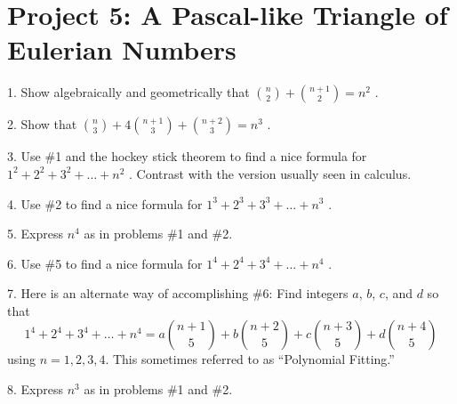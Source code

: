 \documentclass[10pt,]{book}
\theoremstyle{plain}
\theoremstyle{definition}
\theoremstyle{definition}
\theoremstyle{definition}
\numberwithin{equation}{chapter}
\begin{document}
\section[{Project 5: A Pascal-like Triangle of Eulerian Numbers}]{Project 5: A Pascal-like Triangle of Eulerian Numbers}\label{exercises-5}
\begin{exerciselist}
\item[1.]\hypertarget{exercise-35}{}\hypertarget{p-1710}{}%
Show algebraically and geometrically that \(\binom{n}{2}
+
\binom{n + 1}{2}
= n^{2}\) .%
\par\smallskip
\item[2.]\hypertarget{exercise-36}{}\hypertarget{p-1711}{}%
Show that \(\binom{n}{3}
+ 4
\binom{n + 1}{3}
+
\binom{n + 2}{3}
= n^{3}\) .%
\par\smallskip
\item[3.]\hypertarget{exercise-37}{}\hypertarget{p-1712}{}%
Use \#1 and the hockey stick theorem to find a nice formula for \(1^{2} + 2^{2} + 3^{2} + \ldots + n^{2}\) . Contrast with the version usually seen in calculus.%
\par\smallskip
\item[4.]\hypertarget{exercise-38}{}\hypertarget{p-1713}{}%
Use \#2 to find a nice formula for \(1^{3} + 2^{3} + 3^{3} + \ldots + n^{3}\) .%
\par\smallskip
\item[5.]\hypertarget{exercise-39}{}\hypertarget{p-1714}{}%
Express \(n^{4}\) as in problems \#1 and \#2.%
\par\smallskip
\item[6.]\hypertarget{exercise-40}{}\hypertarget{p-1715}{}%
Use \#5 to find a nice formula for \(1^{4} + 2^{4} + 3^{4} + \ldots + n^{4}\) .%
\par\smallskip
\item[7.]\hypertarget{exercise-41}{}\hypertarget{p-1716}{}%
Here is an alternate way of accomplishing \#6:  Find integers \(a\), \(b\), \(c\), and \(d\) so that%
\begin{equation*}
1^{4} + 2^{4} + 3^{4} + \ldots + n^{4} = a\binom{n + 1}{5}  + b\binom{n + 2}{5}  + c\binom{n + 3}{5}  + d\binom{n + 4}{5}
\end{equation*}
using \(n=1, 2, 3, 4\). This sometimes referred to as ``Polynomial Fitting.''%
\par\smallskip
\item[8.]\hypertarget{exercise-42}{}\hypertarget{p-1717}{}%
Express \(n^{3}\) as in problems \#1 and \#2.%
\par\smallskip

\end{exerciselist}
\end{document}

